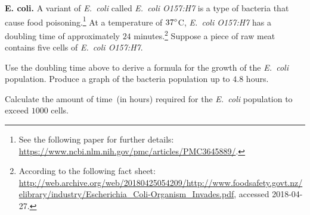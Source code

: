 \documentclass[a4paper,oneside,12pt]{article}
\begin{document}
\begin{exercise}
\textbf{E. coli.}
A variant of \emph{E.~coli} called \emph{E.~coli O157:H7} is a type of
bacteria that cause food poisoning.\footnote{
  See the following paper for further details:
  \url{https://www.ncbi.nlm.nih.gov/pmc/articles/PMC3645889/}.
}
At a temperature of ${37}^{\circ}$C, \emph{E.~coli O157:H7} has a
doubling time of approximately $24$ minutes.\footnote{
  According to the following fact sheet:
  \url{http://web.archive.org/web/20180425054209/http://www.foodsafety.govt.nz/elibrary/industry/Escherichia_Coli-Organism_Invades.pdf},
  accessed 2018-04-27.
}
Suppose a piece of raw meat contains five cells of
\emph{E.~coli O157:H7}.
\begin{packedenum}
\item\label{subex:exponential:E_coli_formula_graph}
  Use the doubling time above to derive a formula for the growth of
  the \emph{E.~coli} population.  Produce a graph of the bacteria
  population up to $4.8$ hours.

\item\label{subex:exponential:E_coli_1000_cells}
  Calculate the amount of time~(in hours) required for the
  \emph{E.~coli} population to exceed $1000$ cells.
\end{packedenum}
\end{exercise}
\end{document}
